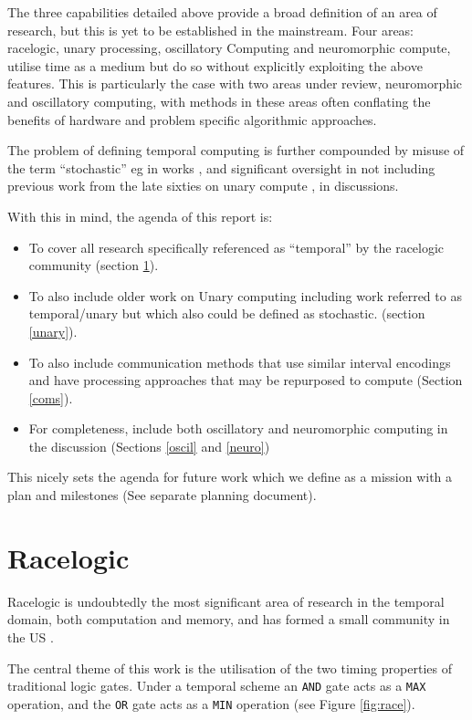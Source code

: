 \documentclass{article}
\begin{document}
The three capabilities detailed above provide a broad definition of an area of research, but this is yet to be established in the mainstream. Four areas: racelogic, unary processing, oscillatory Computing and neuromorphic compute, utilise time as a medium but do so without explicitly exploiting the above features. This is particularly the case with two areas under review, neuromorphic and oscillatory computing, with methods in these areas often conflating the benefits of hardware and problem specific algorithmic approaches.

The problem of defining temporal computing is further compounded by misuse of the term ``stochastic'' eg in works \cite{wu2020ugemm,wu2023power}, and significant oversight in not including previous work from the late sixties on unary compute \cite{POPPELBAUM198747}, in discussions.

With this in mind, the agenda of this report is:
\begin{itemize}
	\item To cover all research specifically referenced as ``temporal'' by the racelogic community (section \ref{race}).
	\item To also include older work on Unary computing including work referred to as temporal/unary but which also could be defined as stochastic. (section \ref{unary}).
	\item To also include communication methods that use similar interval encodings and have processing approaches that may be repurposed to compute (Section \ref{coms}).
	\item For completeness, include both oscillatory and neuromorphic computing in the discussion (Sections \ref{oscil} and \ref{neuro})
\end{itemize}

This nicely sets the agenda for future work which we define as a mission with a plan and milestones (See separate planning document).

\section{Racelogic} \label{race}
Racelogic is undoubtedly the most significant area of research in the temporal domain, both computation and memory, and has formed a small community in the US \cite{madhavan2014race}.

The central theme of this work is the utilisation of the two timing properties of traditional logic gates. Under a temporal scheme an \texttt{AND} gate acts as a \texttt{MAX} operation, and the \texttt{OR} gate acts as a \texttt{MIN} operation (see Figure \ref{fig:race}).
\end{document}
